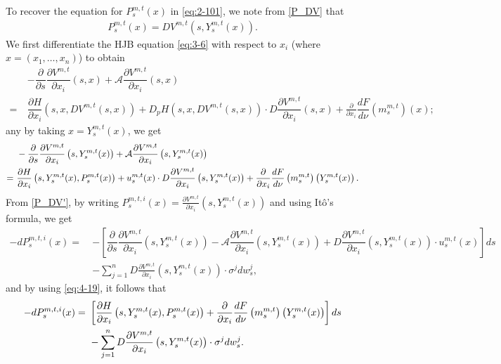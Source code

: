 \documentclass[11pt]{article}
\numberwithin{equation}{section}
\newcommand{\1}{\mbox{1\hspace{-1mm}I}}
\begin{document}
To recover the equation for $P^{m,t}_s(x)$ in \eqref{eq:2-101}, we note from \eqref{P_DV} that
\begin{align}
    P^{m,t}_s(x)=DV^{m,t}\left(s,Y^{m,t}_s(x)\right). \label{P_DV'}
\end{align}
We first differentiate the HJB equation \eqref{eq:3-6} with respect to $x_i$ (where $x=(x_1,\dots,x_n)$) to obtain
\begin{align*}
    &-\dfrac{\partial}{\partial s}\dfrac{\partial V^{m,t}}{\partial x_{i}}(s,x)+\mathcal{A}\dfrac{\partial V^{m,t}}{\partial x_{i}}(s,x)\\
    =\ & \dfrac{\partial H}{\partial x_{i}}\left(s,x,DV^{m,t}(s,x)\right)+D_p H\left(s,x,DV^{m,t}(s,x)\right) \cdot D\dfrac{\partial V^{m,t}}{\partial x_{i}}(s,x)+\frac{\partial}{\partial x_{i}}\dfrac{d F}{d\nu}\left(m^{m,t}_s\right)(x);
\end{align*}
any by taking $x=Y^{m,t}_s(x)$, we get 
\begin{align}
    &-\dfrac{\partial}{\partial s}\dfrac{\partial V^{m,t}}{\partial x_{i}}\left(s,Y^{m,t}_s(x)\right)+\mathcal{A}\dfrac{\partial V^{m,t}}{\partial x_{i}}\left(s,Y^{m,t}_s(x)\right) \notag \\
    =\ & \dfrac{\partial H}{\partial x_{i}}\left(s,Y^{m,t}_s(x),P^{m,t}_s(x)\right)+u^{m,t}_s(x)\cdot D\dfrac{\partial V^{m,t}}{\partial x_{i}}\left(s,Y^{m,t}_s(x)\right) +\dfrac{\partial}{\partial x_{i}}\dfrac{dF}{d\nu}\left(m^{m,t}_s\right)\left(Y^{m,t}_s(x)\right). \label{eq:4-19}
\end{align}
From \eqref{P_DV'}, by writing $P^{m,t,i}_s(x)=\frac{\partial V^{m,t}}{\partial x_{i}}\left(s,Y^{m,t}_s(x)\right)$ and using It\^o's formula, we get 
\begin{align*}
    -dP^{m,t,i}_s(x)=\ & -\left[\dfrac{\partial}{\partial s}\dfrac{\partial V^{m,t}}{\partial x_{i}}\left(s,Y^{m,t}_s(x)\right)-\mathcal{A}\dfrac{\partial V^{m,t}}{\partial x_{i}}\left(s,Y^{m,t}_s(x)\right)+D\dfrac{\partial V^{m,t}}{\partial x_{i}}\left(s,Y^{m,t}_s(x)\right)\cdot u^{m,t}_s(x) \right]ds\\
    &-\sum_{j=1}^n D\frac{\partial V^{m,t}}{\partial x_{i}}\left(s,Y^{m,t}_s(x)\right)\cdot \sigma^{j}dw^{j}_s,
\end{align*}
and by using \eqref{eq:4-19}, it follows that
\begin{align}
    -dP^{m,t,i}_s(x)=\ & \left[\dfrac{\partial H}{\partial x_{i}}\left(s,Y^{m,t}_s(x),P^{m,t}_s(x)\right) +\dfrac{\partial}{\partial x_{i}}\dfrac{dF}{d\nu}\left(m^{m,t}_s\right)\left(Y^{m,t}_s(x)\right)\right]ds \notag \\
    &-\sum_{j=1}^n D\frac{\partial V^{m,t}}{\partial x_{i}}\left(s,Y^{m,t}_s(x)\right)\cdot \sigma^{j}dw^{j}_s. \label{BSDE:P'}
\end{align}
\end{document}
